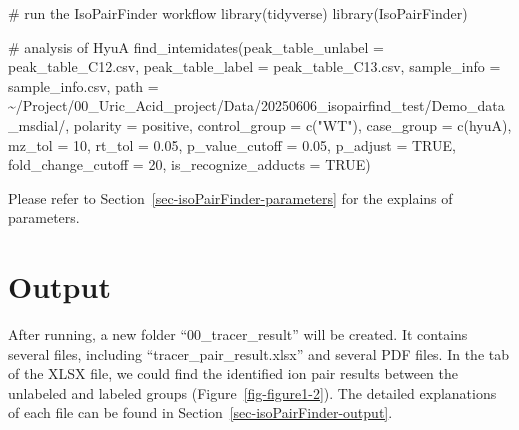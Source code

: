 \documentclass[
  letterpaper,
  DIV=11,
  numbers=noendperiod]{scrreprt}
\newenvironment{Shaded}{\begin{snugshade}}{\end{snugshade}}
\newcommand{\AttributeTok}[1]{\textcolor[rgb]{0.40,0.45,0.13}{#1}}
\newcommand{\CommentTok}[1]{\textcolor[rgb]{0.37,0.37,0.37}{#1}}
\newcommand{\ConstantTok}[1]{\textcolor[rgb]{0.56,0.35,0.01}{#1}}
\newcommand{\DecValTok}[1]{\textcolor[rgb]{0.68,0.00,0.00}{#1}}
\newcommand{\FloatTok}[1]{\textcolor[rgb]{0.68,0.00,0.00}{#1}}
\newcommand{\FunctionTok}[1]{\textcolor[rgb]{0.28,0.35,0.67}{#1}}
\newcommand{\NormalTok}[1]{\textcolor[rgb]{0.00,0.23,0.31}{#1}}
\newcommand{\StringTok}[1]{\textcolor[rgb]{0.13,0.47,0.30}{#1}}
\begin{document}
\begin{Shaded}
\begin{Highlighting}[]
\CommentTok{\# run the IsoPairFinder workflow}
\FunctionTok{library}\NormalTok{(tidyverse)}
\FunctionTok{library}\NormalTok{(IsoPairFinder)}

\CommentTok{\# analysis of HyuA }
\FunctionTok{find\_intemidates}\NormalTok{(}\AttributeTok{peak\_table\_unlabel =} \StringTok{\textquotesingle{}peak\_table\_C12.csv\textquotesingle{}}\NormalTok{,}
                 \AttributeTok{peak\_table\_label =} \StringTok{\textquotesingle{}peak\_table\_C13.csv\textquotesingle{}}\NormalTok{,}
                 \AttributeTok{sample\_info =} \StringTok{\textquotesingle{}sample\_info.csv\textquotesingle{}}\NormalTok{,}
                 \AttributeTok{path =} \StringTok{\textquotesingle{}\textasciitilde{}/Project/00\_Uric\_Acid\_project/Data/20250606\_isopairfind\_test/Demo\_data\_msdial/\textquotesingle{}}\NormalTok{,}
                 \AttributeTok{polarity =} \StringTok{\textquotesingle{}positive\textquotesingle{}}\NormalTok{,}
                 \AttributeTok{control\_group =} \FunctionTok{c}\NormalTok{(}\StringTok{"WT"}\NormalTok{),}
                 \AttributeTok{case\_group =} \FunctionTok{c}\NormalTok{(}\StringTok{\textquotesingle{}hyuA\textquotesingle{}}\NormalTok{),}
                 \AttributeTok{mz\_tol =} \DecValTok{10}\NormalTok{,}
                 \AttributeTok{rt\_tol =} \FloatTok{0.05}\NormalTok{,}
                 \AttributeTok{p\_value\_cutoff =} \FloatTok{0.05}\NormalTok{,}
                 \AttributeTok{p\_adjust =} \ConstantTok{TRUE}\NormalTok{,}
                 \AttributeTok{fold\_change\_cutoff =} \DecValTok{20}\NormalTok{,}
                 \AttributeTok{is\_recognize\_adducts =} \ConstantTok{TRUE}\NormalTok{)}
\end{Highlighting}
\end{Shaded}

Please refer to Section~\ref{sec-isoPairFinder-parameters} for the
explains of parameters.

\section{Output}\label{output}

After running, a new folder ``00\_tracer\_result'' will be created. It
contains several files, including ``tracer\_pair\_result.xlsx'' and
several PDF files. In the tab of the XLSX file, we could find the
identified ion pair results between the unlabeled and labeled groups
(Figure~\ref{fig-figure1-2}). The detailed explanations of each file can
be found in Section~\ref{sec-isoPairFinder-output}.
\end{document}
